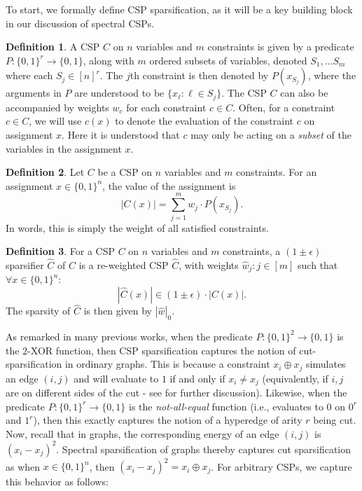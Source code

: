 \documentclass[11pt]{article}
\theoremstyle{definition}
\newtheorem{definition}{Definition}[section]
\newcommand{\zo}{\{0, 1\}}
\newcommand{\eps}{\epsilon}
\begin{document}
To start, we formally define CSP sparsification, as it will be a key building block in our discussion of spectral CSPs.

\begin{definition}
    A CSP $C$ on $n$ variables and $m$ constraints is given by a predicate $P: \zo^r \rightarrow \zo$, along with $m$ ordered subsets of variables, denoted $S_1, \dots S_m$ where each $S_j \in [n]^r$. The $j$th constraint is then denoted by $P(x_{S_j})$, where the arguments in $P$ are understood to be $\{x_{\ell}: \ell \in S_j\}$. The CSP $C$ can also be accompanied by weights $w_c$ for each constraint $c \in C$. Often, for a constraint $c \in C$, we will use $c(x)$ to denote the evaluation of the constraint $c$ on assignment $x$. Here it is understood that $c$ may only be acting on a \emph{subset} of the variables in the assignment $x$.
\end{definition}

\begin{definition}
    Let $C$ be a CSP on $n$ variables and $m$ constraints. For an assignment $x \in \zo^n$, the value of the assignment is
    \[
    |C(x)| = \sum_{j = 1}^m w_j \cdot P(x_{S_j}).
    \]
    In words, this is simply the weight of all satisfied constraints. 
\end{definition}

\begin{definition}
    For a CSP $C$ on $n$ variables and $m$ constraints, a $(1 \pm \eps)$ sparsifier $\hat{C}$ of $C$ is a re-weighted CSP $\hat{C}$, with weights $\hat{w}_j: j \in [m]$ such that $\forall x \in \zo^n$:
    \[
    |\hat{C}(x)| \in (1 \pm \eps) \cdot |C(x)|.
    \]
    The sparsity of $\hat{C}$ is then given by $|\hat{w}|_0$.
\end{definition}

As remarked in many previous works, when the predicate $P: \zo^2 \rightarrow \zo$ is the $2$-XOR function, then CSP sparsification captures the notion of cut-sparsification in ordinary graphs. This is because a constraint $x_i \oplus x_j$ simulates an edge $(i,j)$ and will evaluate to $1$ if and only if $x_i \neq x_j$ (equivalently, if $i,j$ are on different sides of the cut - see \cite{KPS24} for further discussion). Likewise, when the predicate $P: \zo^r \rightarrow \zo$ is the \emph{not-all-equal} function (i.e., evaluates to $0$ on $0^r$ and $1^r$), then this exactly captures the notion of a hyperedge of arity $r$ being cut. Now, recall that in graphs, the corresponding energy of an edge $(i,j)$ is $(x_i - x_j)^2$. Spectral sparsification of graphs thereby captures cut sparsification as when $x \in \zo^n$, then $(x_i - x_j)^2 = x_i \oplus x_j$. For arbitrary CSPs, we capture this behavior as follows:
\end{document}
